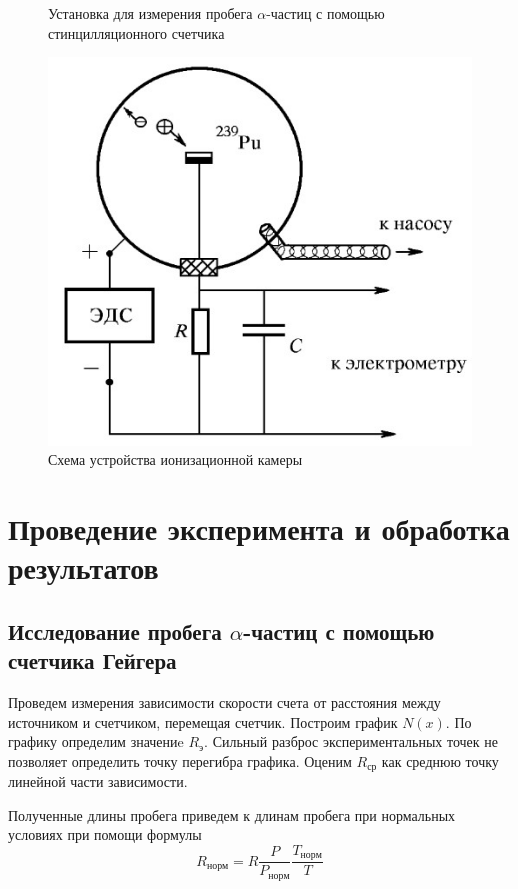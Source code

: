 \documentclass[14pt, a4paper]{report}
\begin{document}
\begin{figure}[H]
\begin{minipage}{.3\textwidth}
  \caption{Установка для измерения пробега $\alpha$-частиц с помощью стинцилляционного счетчика}
\end{minipage}%
\begin{minipage}{.3\textwidth}
  \centering
  \includegraphics[width=.9\linewidth]{../images/541-3}
  \caption{Схема устройства ионизационной камеры}
\end{minipage}
\end{figure}
\captionsetup{width=.75\textwidth}

\newpage

\section{Проведение эксперимента и обработка результатов}

\subsection{Исследование пробега $\alpha$-частиц с помощью счетчика Гейгера}

Проведем измерения зависимости скорости счета от расстояния между источником и счетчиком, перемещая счетчик. Построим график $N(x)$. По графику определим значениe $R_{э}$. Сильный разброс экспериментальных точек не позволяет определить точку перегибра графика. Оценим $R_{ср}$ как среднюю точку линейной части зависимости.

Полученные длины пробега приведем к длинам пробега при нормальных условиях при помощи формулы
\[R_{норм}=R\frac{P}{P_{норм}}\frac{T_{норм}}{T}\]
 
\end{document}
